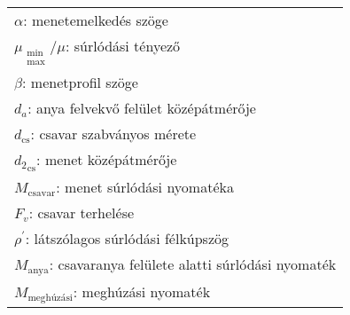 \begin{center}
	\begin{tabular}{l}
		$\alpha$: menetemelkedés szöge \siunit{}{\degree} \\
		$\mu_{\substack{\text{min}\\\text{max}}} / \mu$: súrlódási tényező \siunit{}{-} \\
		$\beta$: menetprofil szöge \siunit{}{\degree} \\
		$d_a$: anya felvekvő felület középátmérője \siunit{}{\mm} \\
		$d_\text{cs}$: csavar szabványos mérete \siunit{}{\mm} \\
		${d_2}_\text{cs}$: menet középátmérője \siunit{}{\mm} \\
		${M_\text{csavar}}$: menet súrlódási nyomatéka \siunit{}{\newton\mm} \\
		$F_v$: csavar terhelése \siunit{}{\newton} \\
		$\rho^{'}$: látszólagos súrlódási félkúpszög \siunit{}{\degree} \\
		${M_\text{anya}}$: csavaranya felülete alatti súrlódási nyomaték \siunit{}{\newton\mm} \\
		${M_\text{meghúzási}}$: meghúzási nyomaték \siunit{}{\newton\mm} \\
	\end{tabular}
\end{center}
